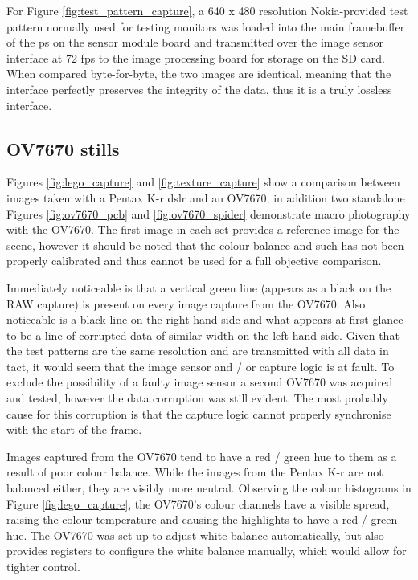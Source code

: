 For Figure \ref{fig:test_pattern_capture}, a 640 x 480 resolution Nokia-provided test pattern normally used for testing monitors was loaded into the main framebuffer of the \gls{ps} on the sensor module board and transmitted over the image sensor interface at 72 \gls{fps} to the image processing board for storage on the SD card. When compared byte-for-byte, the two images are identical, meaning that the interface perfectly preserves the integrity of the data, thus it is a truly lossless interface.

\subsection{OV7670 stills}

Figures \ref{fig:lego_capture} and \ref{fig:texture_capture} show a comparison between images taken with a Pentax K-r \gls{dslr} and an OV7670; in addition two standalone Figures \ref{fig:ov7670_pcb} and \ref{fig:ov7670_spider} demonstrate macro photography with the OV7670. The first image in each set provides a reference image for the scene, however it should be noted that the colour balance and such has not been properly calibrated and thus cannot be used for a full objective comparison.

Immediately noticeable is that a vertical green line (appears as a black on the RAW capture) is present on every image capture from the OV7670. Also noticeable is a black line on the right-hand side and what appears at first glance to be a line of corrupted data of similar width on the left hand side. Given that the test patterns are the same resolution and are transmitted with all data in tact, it would seem that the image sensor and / or capture logic is at fault. To exclude the possibility of a faulty image sensor a second OV7670 was acquired and tested, however the data corruption was still evident. The most probably cause for this corruption is that the capture logic cannot properly synchronise with the start of the frame.

Images captured from the OV7670 tend to have a red / green hue to them as a result of poor colour balance. While the images from the Pentax K-r are not balanced either, they are visibly more neutral. Observing the colour histograms in Figure \ref{fig:lego_capture}, the OV7670's colour channels have a visible spread, raising the colour temperature and causing the highlights to have a red / green hue. The OV7670 was set up to adjust white balance automatically, but also provides registers to configure the white balance manually, which would allow for tighter control.

